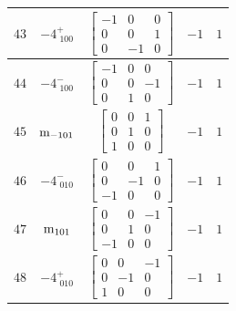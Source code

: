 \documentclass[fleqn,8pt]{jsarticle}
\begin{document}
\begin{longtable}{ccccc}
$ 43 $ & $ -4^{+}_{\,\,100} $ & $ \begin{bmatrix} -1 & 0 & 0 \\ 0 & 0 & 1 \\ 0 & -1 & 0 \end{bmatrix} $ & $ -1 $ & $ 1 $ \\ \hline
$ 44 $ & $ -4^{-}_{\,\,100} $ & $ \begin{bmatrix} -1 & 0 & 0 \\ 0 & 0 & -1 \\ 0 & 1 & 0 \end{bmatrix} $ & $ -1 $ & $ 1 $ \\ \hline
$ 45 $ & $ {\rm m}_{-101} $ & $ \begin{bmatrix} 0 & 0 & 1 \\ 0 & 1 & 0 \\ 1 & 0 & 0 \end{bmatrix} $ & $ -1 $ & $ 1 $ \\ \hline
$ 46 $ & $ -4^{-}_{\,\,010} $ & $ \begin{bmatrix} 0 & 0 & 1 \\ 0 & -1 & 0 \\ -1 & 0 & 0 \end{bmatrix} $ & $ -1 $ & $ 1 $ \\ \hline
$ 47 $ & $ {\rm m}_{101} $ & $ \begin{bmatrix} 0 & 0 & -1 \\ 0 & 1 & 0 \\ -1 & 0 & 0 \end{bmatrix} $ & $ -1 $ & $ 1 $ \\ \hline
$ 48 $ & $ -4^{+}_{\,\,010} $ & $ \begin{bmatrix} 0 & 0 & -1 \\ 0 & -1 & 0 \\ 1 & 0 & 0 \end{bmatrix} $ & $ -1 $ & $ 1 $ \\
\end{longtable}
\end{document}
